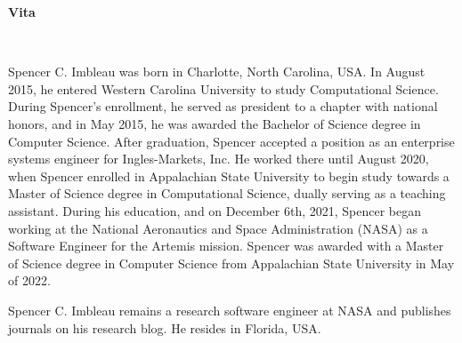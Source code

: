 \vspace*{0.5in}
\begin{center}
    \textbf{Vita}\\[2ex]
\end{center}

\begin{doublespace}
Spencer C. Imbleau was born in Charlotte, North Carolina, USA. In August 2015, he entered Western Carolina University to study Computational Science. During Spencer's enrollment, he served as president to a chapter with national honors, and in May 2015, he was awarded the Bachelor of Science degree in Computer Science. After graduation, Spencer accepted a position as an enterprise systems engineer for Ingles-Markets, Inc. He worked there until August 2020, when Spencer enrolled in Appalachian State University to begin study towards a Master of Science degree in Computational Science, dually serving as a teaching assistant. During his education, and on December 6th, 2021, Spencer began working at the National Aeronautics and Space Administration (NASA) as a Software Engineer for the Artemis mission. Spencer was awarded with a Master of Science degree in Computer Science from Appalachian State University in May of 2022.

Spencer C. Imbleau remains a research software engineer at NASA and publishes journals on his research blog. He resides in Florida, USA.
\end{doublespace}